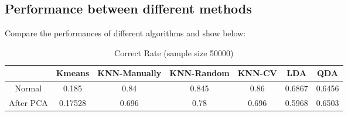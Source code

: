 \documentclass{article}\usepackage[]{graphicx}\usepackage[]{color}
\begin{document}
	\subsection{Performance between different methods}

	\noindent Compare the performances of different algorithms and show below:\\
	\begin{table}[!hbp]
		\begin{tabular}{|c|c|c|c|c|c|c|}
		\hline
		 &Kmeans &KNN-Manually &KNN-Random &KNN-CV&LDA&QDA \\
		\hline
		Normal & 0.185  & 0.84&0.845&0.86&0.6867&0.6456 \\
		\hline
		After PCA & 0.17528 & 0.696&0.78&0.696&0.5968&0.6503 \\
		\hline
	\end{tabular}
	\caption{Correct Rate (sample size 50000)}
	\label{table1}
	\end{table}
\end{document}

